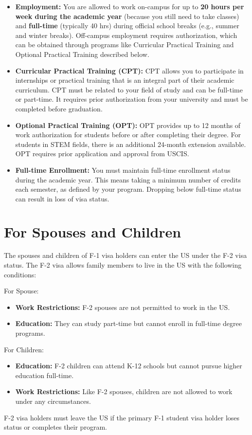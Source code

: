 \documentclass[oneside,11pt,dvipsnames]{book}
\begin{document}
\begin{itemize}
\item \textbf{Employment:} You are allowed to work on-campus for up to \textbf{20 hours per week during the academic year} (because you still need to take classes) and \textbf{full-time} (typically 40 hrs) during official school breaks (e.g., summer and winter breaks). Off-campus employment requires authorization, which can be obtained through programs like Curricular Practical Training and Optional Practical Training described below.

\item \textbf{Curricular Practical Training (CPT):} CPT allows you to participate in internships or practical training that is an integral part of their academic curriculum. CPT must be related to your field of study and can be full-time or part-time. It requires prior authorization from your university and must be completed before graduation.

\item \textbf{Optional Practical Training (OPT):} OPT provides up to 12 months of work authorization for students before or after completing their degree. For students in STEM fields, there is an additional 24-month extension available. OPT requires prior application and approval from USCIS.

\item \textbf{Full-time Enrollment:} You must maintain full-time enrollment status during the academic year. This means taking a minimum number of credits each semester, as defined by your program. Dropping below full-time status can result in loss of visa status.
\end{itemize}




\section{For Spouses and Children}

The spouses and children of F-1 visa holders can enter the US under the F-2 visa status. The F-2 visa allows family members to live in the US with the following conditions:

For Spouse: 
\begin{itemize}
\item \textbf{Work Restrictions:} F-2 spouses are not permitted to work in the US.
\item \textbf{Education:} They can study part-time but cannot enroll in full-time degree programs.
\end{itemize}
For Children:
\begin{itemize}
\item \textbf{Education:} F-2 children can attend K-12 schools but cannot pursue higher education full-time.
\item \textbf{Work Restrictions:} Like F-2 spouses, children are not allowed to work under any circumstances.
\end{itemize}
F-2 visa holders must leave the US if the primary F-1 student visa holder loses status or completes their program.
\end{document}
